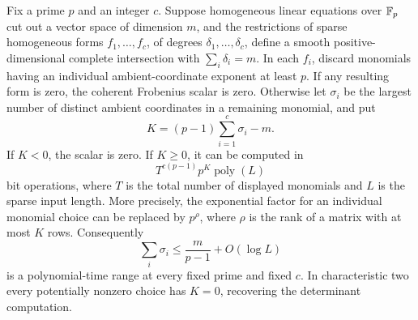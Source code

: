 \begin{theorem}
\label{sp:thm:support-strip}
Fix a prime $p$ and an integer $c$. Suppose homogeneous linear equations
over $\mathbb F_p$ cut out a vector space of dimension $m$, and the restrictions
of sparse homogeneous forms $f_1,\ldots,f_c$, of degrees
$\delta_1,\ldots,\delta_c$, define a smooth positive-dimensional
complete intersection with
$\sum_i\delta_i=m$.
In each $f_i$, discard monomials having an individual ambient-coordinate
exponent at least $p$. If any resulting form is zero, the coherent
Frobenius scalar is zero. Otherwise let $\sigma_i$ be the largest
number of distinct ambient coordinates in a remaining monomial, and put
\[
 K=(p-1)\sum_{i=1}^c\sigma_i-m.
\]
If $K<0$, the scalar is zero. If $K\geq0$, it can be computed in
\[
 T^{c(p-1)}p^K\operatorname{poly}(L)
\]
bit operations, where $T$ is the total number of displayed monomials
and $L$ is the sparse input length. More precisely, the exponential
factor for an individual monomial choice can be replaced by
$p^\rho$, where $\rho$ is the rank of a matrix with at most $K$ rows.
Consequently
\[
 \sum_i\sigma_i\leq\frac{m}{p-1}+O(\log L)
\]
is a polynomial-time range at every fixed prime and fixed $c$.
In characteristic two every potentially nonzero choice has $K=0$,
recovering the determinant computation.
\end{theorem}
